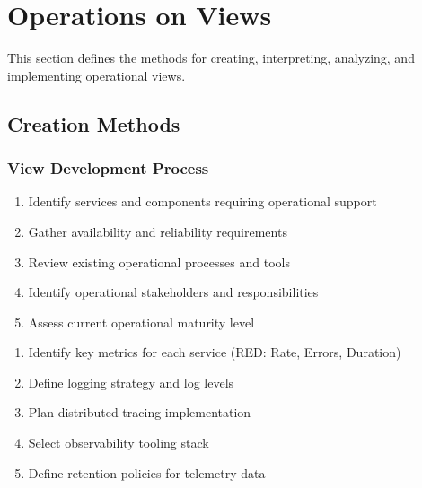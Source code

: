 \documentclass[11pt,letterpaper]{article}
\begin{document}
\section{Operations on Views}

This section defines the methods for creating, interpreting, analyzing, and implementing operational views.

\subsection{Creation Methods}

\subsubsection{View Development Process}

\begin{guidancebox}
\begin{enumerate}[nosep]
    \item Identify services and components requiring operational support
    \item Gather availability and reliability requirements
    \item Review existing operational processes and tools
    \item Identify operational stakeholders and responsibilities
    \item Assess current operational maturity level
\end{enumerate}
\end{guidancebox}

\begin{guidancebox}
\begin{enumerate}[nosep]
    \item Identify key metrics for each service (RED: Rate, Errors, Duration)
    \item Define logging strategy and log levels
    \item Plan distributed tracing implementation
    \item Select observability tooling stack
    \item Define retention policies for telemetry data
\end{enumerate}
\end{guidancebox}
\end{document}

